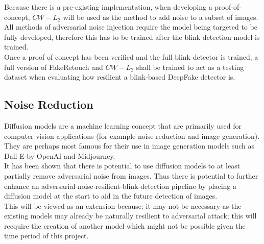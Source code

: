 \documentclass{article}
\begin{document}
Because there is a pre-existing implementation\cite{cwl2python}, when developing a proof-of-concept, $CW-L_2$ will be used as the method to add noise to a subset of images. All methods of adversarial noise injection require the model being targeted to be fully developed, therefore this has to be trained after the blink detection model is trained.\\

Once a proof of concept has been verified and the full blink detector is trained, a full version of FakeRetouch and $CW-L_2$ shall be trained to act as a testing dataset when evaluating how resilient a blink-based DeepFake detector is.

\subsection{Noise Reduction}

Diffusion models are a machine learning concept that are primarily used for computer vision applications (for example noise reduction and image generation)\cite{croitoru2023diffusion}. They are perhaps most famous for their use in image generation models such as Dall-E by OpenAI and Midjourney.\\

It has been shown that there is potential to use diffusion models to at least partially remove adversarial noise from images\cite{nie2022diffusion}\cite{croitoru2023diffusion}. Thus there is potential to further enhance an adversarial-noise-resilient-blink-detection pipeline by placing a diffusion model at the start to aid in the future detection of images.\\

This will be viewed as an extension because: it may not be necessary as the existing models may already be naturally resilient to adversarial attack; this will recquire the creation of another model which might not be possible given the time period of this project.
\end{document}
